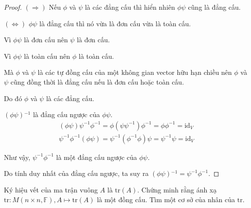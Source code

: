 \documentclass[class=linearalgebra,crop=false]{standalone}
\begin{document}
\begin{proof}
    $(\Rightarrow)$ Nếu $\phi$ và $\psi$ là các đẳng cấu thì hiển nhiên $\phi\psi$ cũng là đẳng cấu.
    \par $(\Leftrightarrow)$ $\phi\psi$ là đẳng cấu thì nó vừa là đơn cấu vừa là toàn cấu.
    \par Vì $\phi\psi$ là đơn cấu nên $\psi$ là đơn cấu.
    \par Vì $\phi\psi$ là toàn cấu nên $\phi$ là toàn cấu.
    \par Mà $\phi$ và $\psi$ là các tự đồng cấu của một không gian vector hữu hạn chiều nên $\phi$ và $\psi$ cũng đồng thời là đẳng cấu nếu là đơn cấu hoặc toàn cấu.
    \par Do đó $\phi$ và $\psi$ là các đẳng cấu.
    \bigskip
    \par $(\phi\psi){}^{-1}$ là đẳng cấu ngược của $\phi\psi$.
    \[
        \begin{split}
            (\phi\psi)\psi^{-1}\phi^{-1} = \phi(\psi\psi^{-1})\phi^{-1} = \phi\phi^{-1} = \text{id}_{V} \\
            \psi^{-1}\phi^{-1}(\phi\psi) = \psi^{-1}(\phi^{-1}\phi)\psi = \psi^{-1}\psi = \text{id}_{V}
        \end{split}
    \]
    \par Như vậy, $\psi^{-1}\phi^{-1}$ là một đẳng cấu ngược của $\phi\psi$.
    \par Do tính duy nhất của đẳng cấu ngược, ta suy ra $(\phi\psi){}^{-1} = \psi^{-1}\phi^{-1}$.
\end{proof}

\begin{exercise}
    Ký hiệu vết của ma trận vuông $A$ là $\text{tr}(A)$. Chứng minh rằng ánh xạ $\text{tr}: M(n\times n, \mathbb{F}), A\mapsto \text{tr}(A)$ là một đồng cấu. Tìm một cơ sở của nhân của $\text{tr}$.
\end{exercise}
\end{document}
